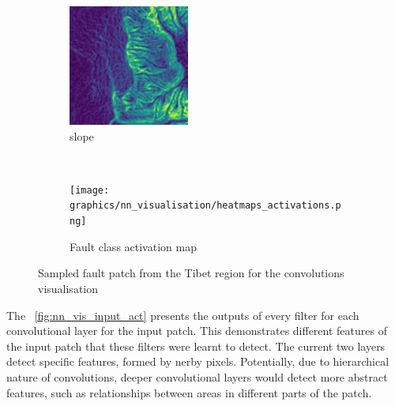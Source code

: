 \documentclass[11pt,a4paper]{article}
\begin{document}
\begin{figure}[t]
    \begin{subfigure}[b]{0.25\textwidth}
        \includegraphics[width=\textwidth]{graphics/nn_visualisation/input_image_4.png}
        \caption{slope}
        \label{fig:nn_vis_conv_filters_inp_3}
    \end{subfigure}
    ~
    \begin{subfigure}[b]{0.25\textwidth}
        \texttt{[image: graphics/nn\_visualisation/heatmaps\_activations.png]}
        \caption{Fault class activation map}
        \label{fig:nn_vis_conv_filters_cam}
    \end{subfigure}

    \caption{Sampled fault patch from the Tibet region for the convolutions visualisation}
    \label{fig:nn_vis_input}
\end{figure}

The \figurename~\ref{fig:nn_vis_input_act} presents the outputs of every filter for each convolutional layer for the
input patch. This demonstrates different features of the input patch that these filters were learnt to detect. The current
two layers detect specific features, formed by nerby pixels. Potentially, due to hierarchical nature of convolutions,
deeper convolutional layers would detect more abstract features, such as relationships between areas in different parts
of the patch.
\end{document}
